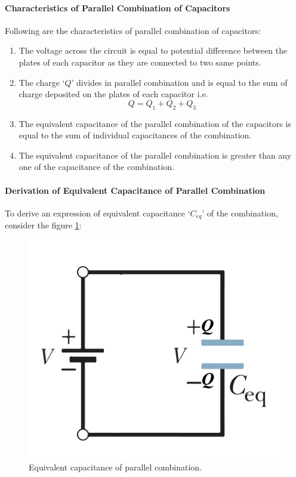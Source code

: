 \paragraph{Characteristics of Parallel Combination of Capacitors}
Following  are  the  characteristics of parallel combination of capacitors:
\begin{enumerate}[label = (\roman*)]
\item The voltage across the circuit is equal to potential difference
between the plates of each capacitor as they are connected to two same
points.
\item The charge `$Q$' divides in parallel combination and is equal to
the sum of charge deposited on the plates of each capacitor i.e.
\begin{equation}\nonumber
  Q = Q_{1} + Q_{2} + Q_{3}
\end{equation}
\item The equivalent capacitance of the parallel combination of the
capacitors is equal to the sum of individual capacitances of the
combination.
\item The equivalent capacitance of the parallel combination is
greater than any one of the capacitance of the combination.
\end{enumerate}        
\paragraph{Derivation of Equivalent Capacitance of Parallel Combination}
To derive an expression of equivalent capacitance `$C_{eq}$’ of the
combination, consider the figure \ref{fig:11.34}:
\begin{figure}[H]
  \centering
  \includegraphics[scale = 0.45]{Images/Chapter-11/11.32}
  \caption{Equivalent capacitance of parallel combination.}
  \label{fig:11.34}
\end{figure}

